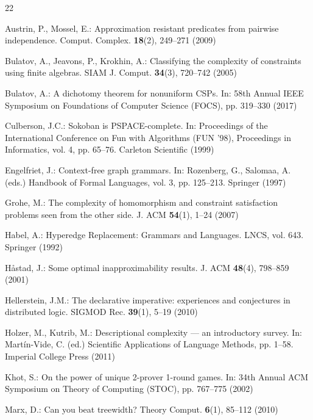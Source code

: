 \documentclass[runningheads]{llncs}
\begin{document}
% 
% 
%
\begin{thebibliography}{22}

Austrin, P., Mossel, E.: Approximation resistant predicates from pairwise independence. Comput. Complex. \textbf{18}(2), 249--271 (2009)

Bulatov, A., Jeavons, P., Krokhin, A.: Classifying the complexity of constraints using finite algebras. SIAM J. Comput. \textbf{34}(3), 720--742 (2005)

Bulatov, A.: A dichotomy theorem for nonuniform CSPs. In: 58th Annual IEEE Symposium on Foundations of Computer Science (FOCS), pp. 319--330 (2017)

Culberson, J.C.: Sokoban is PSPACE-complete. In: Proceedings of the International Conference on Fun with Algorithms (FUN '98), Proceedings in Informatics, vol. 4, pp. 65--76. Carleton Scientific (1999)

Engelfriet, J.: Context-free graph grammars. In: Rozenberg, G., Salomaa, A. (eds.) Handbook of Formal Languages, vol. 3, pp. 125--213. Springer (1997)

Grohe, M.: The complexity of homomorphism and constraint satisfaction problems seen from the other side. J. ACM \textbf{54}(1), 1--24 (2007)

Habel, A.: Hyperedge Replacement: Grammars and Languages. LNCS, vol. 643. Springer (1992)

H\aa stad, J.: Some optimal inapproximability results. J. ACM \textbf{48}(4), 798--859 (2001)

Hellerstein, J.M.: The declarative imperative: experiences and conjectures in distributed logic. SIGMOD Rec. \textbf{39}(1), 5--19 (2010)

Holzer, M., Kutrib, M.: Descriptional complexity --- an introductory survey. In: Mart\'in-Vide, C. (ed.) Scientific Applications of Language Methods, pp. 1--58. Imperial College Press (2011)

Khot, S.: On the power of unique 2-prover 1-round games. In: 34th Annual ACM Symposium on Theory of Computing (STOC), pp. 767--775 (2002)

Marx, D.: Can you beat treewidth? Theory Comput. \textbf{6}(1), 85--112 (2010)


\end{thebibliography}
\end{document}
